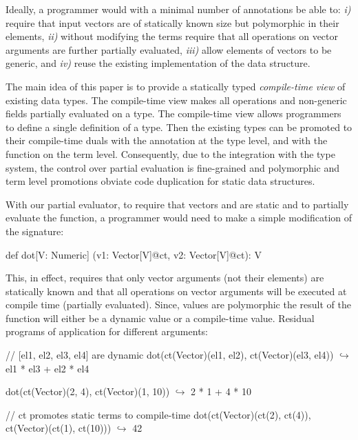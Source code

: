 
Ideally, a programmer would with a minimal number of annotations be able to:
 \emph{i)} require that input vectors are of statically known size but polymorphic
  in their elements, \emph{ii)} without modifying the terms require that all operations
  on vector arguments are further partially evaluated, \emph{iii)} allow elements
  of vectors to be generic, and \emph{iv)} reuse the existing implementation of
  the  data structure.

The main idea of this paper is to provide a statically typed \emph{compile-time
 view} of existing data types. The compile-time view makes all operations and
 non-generic fields partially evaluated on a type. The compile-time view allows
 programmers to define a single definition of a type. Then the existing types
 can be promoted to their compile-time duals with the  annotation at
 the type level, and with the  function on the term level.
 Consequently, due to the integration with the type system, the control over
 partial evaluation is fine-grained and polymorphic and term level promotions
 obviate code duplication for static data structures.

With our partial evaluator, to require that vectors  and  are
 static and to partially evaluate the function, a programmer would need to make
 a simple modification of the  signature:\begin{lstparagraph}
  def dot[V: Numeric]
    (v1: Vector[V]@ct, v2: Vector[V]@ct): V
\end{lstparagraph}

This, in effect, requires that only vector arguments (not their elements) are
 statically known and that all operations on vector arguments will be executed
 at compile time (partially evaluated). Since, values are polymorphic the result
 of the function will either be a dynamic value or a compile-time value. Residual
 programs of  application for different arguments:

\vspace{1.8mm}
\begin{listing}[mathescape]
  // [el1, el2, el3, el4] are dynamic
  dot(ct(Vector)(el1, el2), ct(Vector)(el3, el4))
    $\hookrightarrow$ el1 * el3 + el2 * el4

  dot(ct(Vector)(2, 4), ct(Vector)(1, 10))
    $\hookrightarrow$ 2 * 1 + 4 * 10

  // ct promotes static terms to compile-time
  dot(ct(Vector)(ct(2), ct(4)), ct(Vector)(ct(1), ct(10)))
    $\hookrightarrow$ 42
\end{listing}
\vspace{1.8mm}

